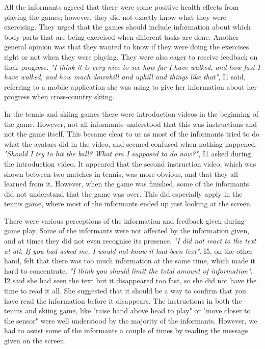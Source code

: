 All the informants agreed that there were some positive health effects from playing the games; however, they did not exactly know what they were exercising. They urged that the games should include information about which body parts that are being exercised when different tasks are done. Another general opinion was that they wanted to know if they were doing the exercises right or not when they were playing. They were also eager to receive feedback on their progress. \emph{"I think it is very nice to see how far I have walked, and how fast I have walked, and how much downhill and uphill and things like that"}, I1 said, referring to a mobile application she was using to give her information about her progress when cross-country skiing.   

In the tennis and skiing games there were introduction videos in the beginning of the game. However, not all informants understood that this was instructions and not the game itself. This became clear to us as most of the informants tried to do what the avatars did in the video, and seemed confused when nothing happened. \emph{"Should I try to hit the ball? What am I supposed to do now?"}, I1 asked during the introduction video. It appeared that the second instruction video, which was shown between two matches in tennis, was more obvious, and that they all learned from it. However, when the game was finished, some of the informants did not understand that the game was over. This did especially apply in the tennis game, where most of the informants ended up just looking at the screen. 

There were various perceptions of the information and feedback given during game play. Some of the informants were not affected by the information given, and at times they did not even recognise its presence. \emph{"I did not react to the text at all. If you had asked me, I would not know it had been text"}. I5, on the other hand, felt that there was too much information at the same time, which made it hard to concentrate. \emph{"I think you should limit the total amount of information"}. I2 said she had seen the text but it disappeared too fast, so she did not have the time to read it all. She suggested that it should be a way to confirm that you have read the information before it disappears. The instructions in both the tennis and skiing game, like "raise hand above head to play" or "move closer to the sensor" were well understood by the majority of the informants. However, we had to assist some of the informants a couple of times by reading the message given on the screen.  


